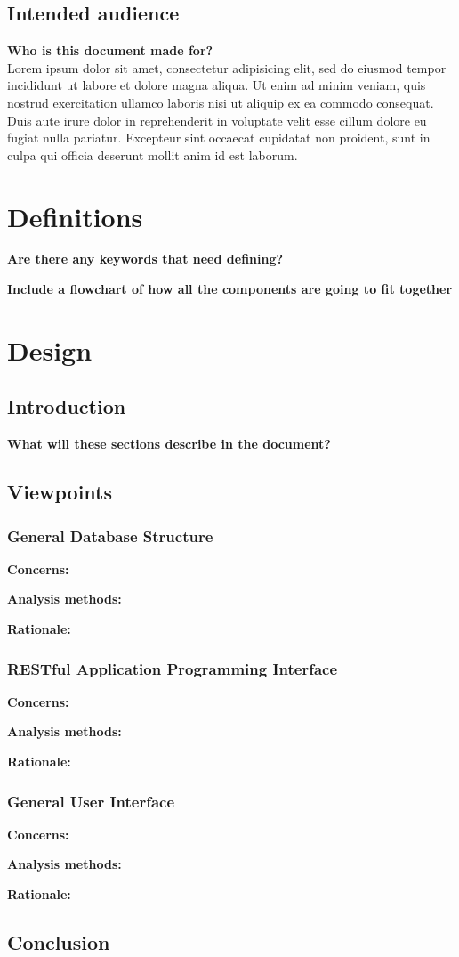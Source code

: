 \documentclass[draftclsnofoot,onecolumn,letterpaper,10pt]{IEEEtran}
\begin{document}
	\subsection{Intended audience}
	\textbf{Who is this document made for?}\\
	Lorem ipsum dolor sit amet, consectetur adipisicing elit, sed do eiusmod tempor incididunt ut labore et dolore magna aliqua. Ut enim ad minim veniam, quis nostrud exercitation ullamco laboris nisi ut aliquip ex ea commodo consequat. Duis aute irure dolor in reprehenderit in voluptate velit esse cillum dolore eu fugiat nulla pariatur. Excepteur sint occaecat cupidatat non proident, sunt in culpa qui officia deserunt mollit anim id est laborum.

\section{Definitions}
	\textbf{Are there any keywords that need defining?}


	\textbf{Include a flowchart of how all the components are going to fit together}


\section{Design}
	\subsection{Introduction}
	\textbf{What will these sections describe in the document?}

	\subsection{Viewpoints}
		\subsubsection{General Database Structure}
			\textbf{Concerns:}

			\textbf{Analysis methods:}

			\textbf{Rationale:}

		\subsubsection{RESTful Application Programming Interface}
			\textbf{Concerns:}

			\textbf{Analysis methods:}

			\textbf{Rationale:}

		\subsubsection{General User Interface}
			\textbf{Concerns:}

			\textbf{Analysis methods:}

			\textbf{Rationale:}

	\subsection{Conclusion}
\end{document}
